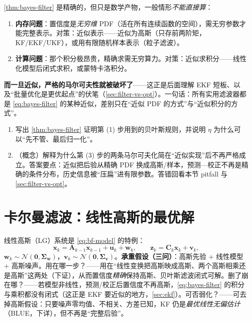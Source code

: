 \begin{pitfall}
\cref{thm:bayes-filter} 是精确的，但只是数学产物，一般情形\emph{不能直接算}\cite{barfoot2024state}：
\begin{enumerate}
  \item \textbf{内存问题}：置信度是\emph{无穷维} PDF（活在所有连续函数的空间），需无穷参数才能完整表示。对策：近似表示——近似为高斯（只存前两阶矩，KF/EKF/UKF），或用有限随机样本表示（粒子滤波）。
  \item \textbf{计算问题}：那个积分极昂贵，精确求需无穷算力。对策：近似求积分——线性化模型后闭式求积，或蒙特卡洛积分。
\end{enumerate}
\textbf{而一旦近似，严格的马尔可夫性就被破坏了}——这正是后面理解 EKF 短板、以及“批量优化是更优起点”的伏笔（\cref{sec:filter-vs-opt}）。一句话：所有实用滤波器都是 \cref{eq:bayes-filter} 的某种近似，差别只在“近似 PDF 的方式”与“近似积分的方式”。
\end{pitfall}

\begin{practice}
\begin{enumerate}
  \item 写出 \cref{thm:bayes-filter} 证明第 (1) 步用到的贝叶斯规则，并说明 $\eta$ 为什么可以“先不管、最后归一化”。
  \item （概念）解释为什么第 (3) 步的两条马尔可夫化简在“近似实现”后不再严格成立。答案要点：近似把后验从精确 PDF 换成高斯/样本，预测—校正不再是精确的条件分布，历史信息被“压扁”进有限参数。答错回看本节 pitfall 与 \cref{sec:filter-vs-opt}。
\end{enumerate}
\end{practice}

\section{卡尔曼滤波：线性高斯的最优解}
\label{sec:kf}

线性高斯（LG）系统是 \cref{eq:bf-model} 的特例：
\begin{equation}
  \mathbf{x}_k=\mathbf{A}_{k-1}\mathbf{x}_{k-1}+\mathbf{u}_k+\mathbf{w}_k,\qquad
  \mathbf{z}_k=\mathbf{C}_k\mathbf{x}_k+\mathbf{v}_k,
  \label{eq:lg-model}
\end{equation}
$\mathbf{w}_k\sim\mathcal{N}(\mathbf{0},\boldsymbol{\Sigma}_{\mathbf{w}})$，$\mathbf{v}_k\sim\mathcal{N}(\mathbf{0},\boldsymbol{\Sigma}_{\mathbf{v}})$。\textbf{承重假设（三问）}：高斯先验 + 线性模型 + 高斯噪声。用在哪一步？——用在“线性变换把高斯映成高斯、两个高斯相乘还是高斯”这两处（下证），从而置信度\emph{精确}保持高斯、贝叶斯滤波闭式可解。删了崩在哪？——若模型非线性，预测/校正后置信度不再高斯，\cref{eq:bayes-filter} 的积分与乘积都没有闭式（这正是 EKF 要近似的地方，\cref{sec:ekf}）。可否弱化？——可去掉高斯假设：只要噪声零均值、不相关、方差已知，KF 仍是\emph{最优线性无偏估计}（BLUE，下详），但不再是“完整后验”。

